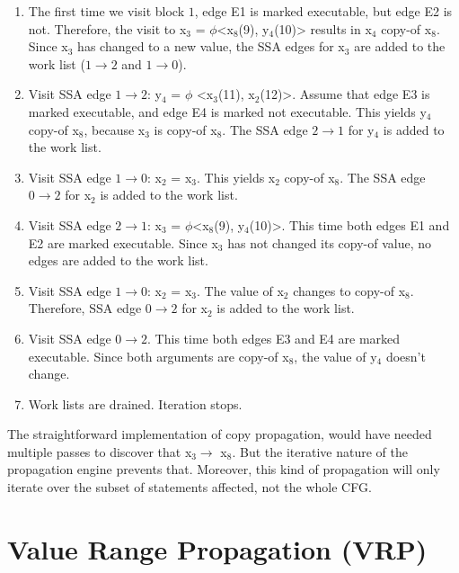 \begin{enumerate}
\item	The first time we visit block $1$, edge E1 is marked
	executable, but edge E2 is not.  Therefore, the visit to
	x$_3$ = $\phi$<x$_8$(9), y$_4$(10)> results in x$_4$
	copy-of x$_8$.  Since x$_3$ has changed to a new value,
	the SSA edges for x$_3$ are added to the work list ($1
	\rightarrow 2$ and $1 \rightarrow 0$).

\item	Visit SSA edge $1 \rightarrow 2$: y$_4$ = $\phi$
	<x$_3$(11), x$_2$(12)>.  Assume that edge E3 is marked
	executable, and edge E4 is marked not executable.  This
	yields y$_4$ copy-of x$_8$, because x$_3$ is copy-of
	x$_8$.  The SSA edge $2 \rightarrow 1$ for y$_4$ is added
	to the work list.

\item	Visit SSA edge $1 \rightarrow 0$: x$_2$ = x$_3$.  This
	yields x$_2$ copy-of x$_8$.  The SSA edge $0 \rightarrow
	2$ for x$_2$ is added to the work list.

\item	Visit SSA edge $2 \rightarrow 1$: x$_3$ =
	$\phi$<x$_8$(9), y$_4$(10)>.  This time both edges E1 and
	E2 are marked executable.  Since x$_3$ has not changed
	its copy-of value, no edges are added to the work list.

\item	Visit SSA edge $1 \rightarrow 0$: x$_2$ = x$_3$.  The
	value of x$_2$ changes to copy-of x$_8$.  Therefore, SSA
	edge $0 \rightarrow 2$ for x$_2$ is added to the work
	list.

\item	Visit SSA edge $0 \rightarrow 2$.  This time both edges
	E3 and E4 are marked executable.  Since both arguments
	are copy-of x$_8$, the value of y$_4$ doesn't change.

\item	Work lists are drained.  Iteration stops.
\end{enumerate}

The straightforward implementation of copy propagation, would
have needed multiple passes to discover that x$_3 \rightarrow$
x$_8$.  But the iterative nature of the propagation engine
prevents that.  Moreover, this kind of propagation will only
iterate over the subset of statements affected, not the whole
CFG.

\section{Value Range Propagation (VRP)}
\label{novillo:sec:vrp}


